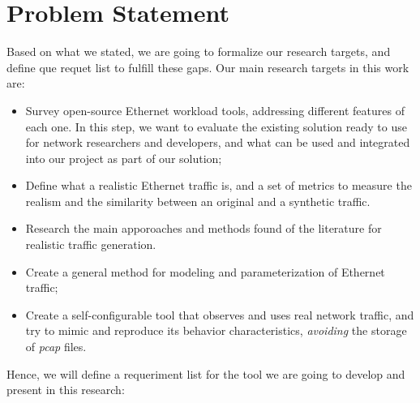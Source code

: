 \section{Problem Statement}


Based on what we stated,  we are going to formalize our research targets, and define que requet list to fulfill these gaps. Our main research targets in this work are:

\begin{itemize}
	
	\item Survey open-source Ethernet workload tools, addressing different features of each one. In this step, we want to evaluate the existing solution ready to use for network researchers and developers, and what can be used and integrated into our project as part of our solution;
	
	\item Define what a realistic Ethernet traffic is, and a set of metrics to measure the realism and the similarity between an original and a synthetic traffic.
	
	\item Research the main apporoaches and methods found of the literature for realistic traffic generation. 
	
	\item Create a general method for modeling and parameterization of Ethernet traffic;
	
	\item Create a self-configurable tool that observes and uses real network traffic, and try to mimic and reproduce its behavior characteristics, \textit{avoiding} the storage of \textit{pcap} files.
	
\end{itemize}

Hence, we will define a requeriment list for the tool we are going to develop and present in this research:

